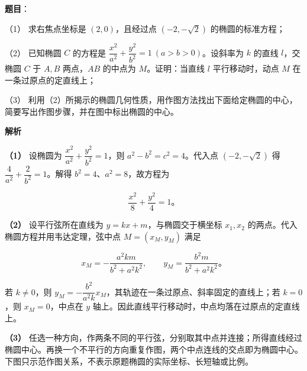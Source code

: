 \begin{answer}

\textbf{题目}：

（1） 求右焦点坐标是 $(2,0)$，且经过点 $(-2,-\sqrt2)$ 的椭圆的标准方程；

（2） 已知椭圆 $C$ 的方程是 $\dfrac{x^2}{a^2}+\dfrac{y^2}{b^2}=1\ (a>b>0)$。设斜率为 $k$ 的直线 $l$，交椭圆 $C$ 于 $A,B$ 两点，$AB$ 的中点为 $M$。证明：当直线 $l$ 平行移动时，动点 $M$ 在一条过原点的定直线上；

（3） 利用（2）所揭示的椭圆几何性质，用作图方法找出下面给定椭圆的中心，简要写出作图步骤，并在图中标出椭圆的中心。
\nopagebreak[4]
\begin{center}\end{center}
\nopagebreak[4]
\textbf{解析}

\textbf{（1）} 设椭圆为 $\dfrac{x^2}{a^2}+\dfrac{y^2}{b^2}=1$，则 $a^2-b^2=c^2=4$。代入点 $(-2,-\sqrt2)$ 得 $\dfrac4{a^2}+\dfrac2{b^2}=1$。解得 $b^2=4$、$a^2=8$，故方程为

\nopagebreak[4]
\[
\frac{x^2}{8}+\frac{y^2}{4}=1\text{。}
\]

\textbf{（2）} 设平行弦所在直线为 $y=kx+m$，与椭圆交于横坐标 $x_1,x_2$ 的两点。代入椭圆方程并用韦达定理，弦中点 $M=(x_M,y_M)$ 满足

\nopagebreak[4]
\[
x_M=-\frac{a^2km}{b^2+a^2k^2},\qquad
y_M=\frac{b^2m}{b^2+a^2k^2}\text{。}
\]

若 $k\ne0$，则 $y_M=-\dfrac{b^2}{a^2k}x_M$，其轨迹在一条过原点、斜率固定的直线上；若 $k=0$，则 $x_M=0$，中点在 $y$ 轴上。因此直线平行移动时，中点均落在过原点的定直线上。

\textbf{（3）} 任选一种方向，作两条不同的平行弦，分别取其中点并连接；所得直线经过椭圆中心。再换一个不平行的方向重复作图，两个中点连线的交点即为椭圆中心。下图只示范作图关系，不表示原题椭圆的实际坐标、长短轴或比例。
\nopagebreak[4]
\begin{center}\end{center}
\nopagebreak[4]



\end{answer}